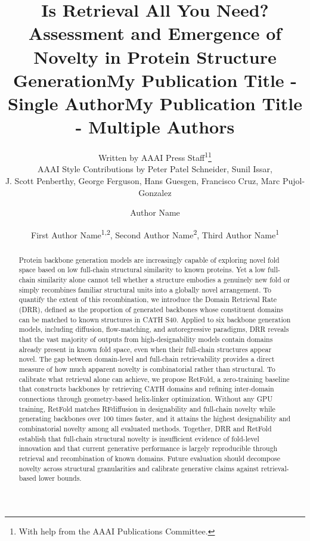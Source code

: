 \documentclass[letterpaper]{article} %
\title{Is Retrieval All You Need? Assessment and Emergence of Novelty in Protein Structure Generation}
\author{
    Written by AAAI Press Staff\textsuperscript{\rm 1}\thanks{With help from the AAAI Publications Committee.}\\
    AAAI Style Contributions by Peter Patel Schneider,
    Sunil Issar,\\
    J. Scott Penberthy,
    George Ferguson,
    Hans Guesgen,
    Francisco Cruz\equalcontrib\corresponding,
    Marc Pujol-Gonzalez\equalcontrib\corresponding
}
\title{My Publication Title - Single Author}
\author {
    Author Name
}
\title{My Publication Title - Multiple Authors}
\author {
    First Author Name\textsuperscript{\rm 1,\rm 2}\equalcontrib,
    Second Author Name\textsuperscript{\rm 2}\equalcontrib,
    Third Author Name\textsuperscript{\rm 1}\corresponding
}
\begin{document}
\maketitle

\begin{abstract}
Protein backbone generation models are increasingly capable of exploring novel fold space based on low full-chain structural similarity to known proteins. Yet a low full-chain similarity alone cannot tell whether a structure embodies a genuinely new fold or simply recombines familiar structural units into a globally novel arrangement. To quantify the extent of this recombination, we introduce the Domain Retrieval Rate (DRR), defined as the proportion of generated backbones whose constituent domains can be matched to known structures in CATH S40. Applied to six backbone generation models, including diffusion, flow-matching, and autoregressive paradigms, DRR reveals that the vast majority of outputs from high-designability models contain domains already present in known fold space, even when their full-chain structures appear novel. The gap between domain-level and full-chain retrievability provides a direct measure of how much apparent novelty is combinatorial rather than structural. To calibrate what retrieval alone can achieve, we propose RetFold, a zero-training baseline that constructs backbones by retrieving CATH domains and refining inter-domain connections through geometry-based helix-linker optimization. Without any GPU training, RetFold matches RFdiffusion in designability and full-chain novelty while generating backbones over 100 times faster, and it attains the highest designability and combinatorial novelty among all evaluated methods. Together, DRR and RetFold establish that full-chain structural novelty is insufficient evidence of fold-level innovation and that current generative performance is largely reproducible through retrieval and recombination of known domains. Future evaluation should decompose novelty across structural granularities and calibrate generative claims against retrieval-based lower bounds.
\end{abstract}

\end{document}
